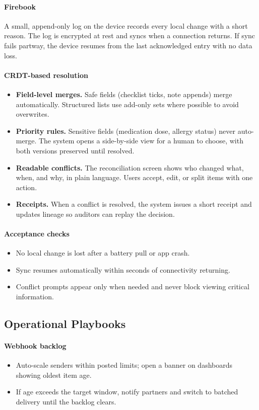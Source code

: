 \documentclass[12pt]{article}
\begin{document}
\paragraph{Firebook}
A small, append-only log on the device records every local change with a short reason. The log is encrypted at rest and syncs when a connection returns. If sync fails partway, the device resumes from the last acknowledged entry with no data loss.

\paragraph{CRDT-based resolution}
\begin{itemize}[leftmargin=*]
  \item \textbf{Field-level merges.} Safe fields (checklist ticks, note appends) merge automatically. Structured lists use add-only sets where possible to avoid overwrites.
  \item \textbf{Priority rules.} Sensitive fields (medication dose, allergy status) never auto-merge. The system opens a side-by-side view for a human to choose, with both versions preserved until resolved.
  \item \textbf{Readable conflicts.} The reconciliation screen shows who changed what, when, and why, in plain language. Users accept, edit, or split items with one action.
  \item \textbf{Receipts.} When a conflict is resolved, the system issues a short receipt and updates lineage so auditors can replay the decision.
\end{itemize}

\paragraph{Acceptance checks}
\begin{itemize}[leftmargin=*]
  \item No local change is lost after a battery pull or app crash.
  \item Sync resumes automatically within seconds of connectivity returning.
  \item Conflict prompts appear only when needed and never block viewing critical information.
\end{itemize}

\subsection*{Operational Playbooks}
\paragraph{Webhook backlog}
\begin{itemize}[leftmargin=*]
  \item Auto-scale senders within posted limits; open a banner on dashboards showing oldest item age.
  \item If age exceeds the target window, notify partners and switch to batched delivery until the backlog clears.
\end{itemize}
\end{document}
